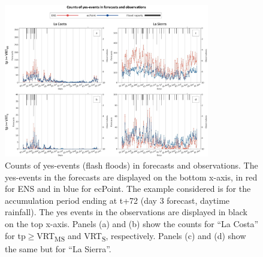 \documentclass[techmemo]{ecmwfrep}%
\begin{document}
\begin{figure}
\centering
\includegraphics[width=0.8\textwidth]{Figures/13_RESULTS_Count_Yes_Events.jpg}
\caption{Counts of yes-events (flash floods) in forecasts and observations. The yes-events in the forecasts are displayed on the bottom x-axis, in red for ENS and in blue for ecPoint. The example considered is for the accumulation period ending at t+72 (day 3 forecast, daytime rainfall). The yes events in the observations are displayed in black on the top x-axis. Panels (a) and (b) show the counts for “La Costa” for tp$\geq$VRT\textsubscript{MS} and VRT\textsubscript{S}, respectively. Panels (c) and (d) show the same but for “La Sierra”.}
\label{fig:Counts_Yes_Events}
\end{figure}
\end{document}
